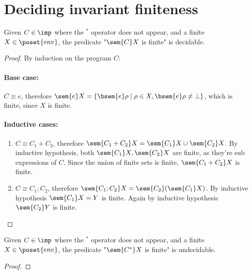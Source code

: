 \section{Deciding invariant finiteness}

\begin{lemma}\label{le:finiteness}
  Given \(C\in\imp\) where the \(^*\) operator does not appear, and a
  finite \(X \in \poset{env}\), the predicate "\(\sem{C}X\) is finite"
  is decidable.
\end{lemma}

\begin{proof}
  By induction on the program \(C\):
  \paragraph*{Base case:\\}
  \(C \equiv e\), therefore \(\sem{e}X = \{\bsem{e}\rho \mid \rho \in
  X , \bsem{e}\rho \neq \bot\}\), which is finite, since \(X\) is
  finite.
  
  \paragraph*{Inductive cases:\\}
  \begin{enumerate}
  \item \(C\equiv C_1 + C_2\), therefore \(\sem{C_1 + C_2} X =
    \sem{C_1}X \cup \sem{C_2}X\). By inductive hypothesis, both
    \(\sem{C_1}X, \sem{C_2}X\) are finite, as they're sub expressions
    of \(C\). Since the union of finite sets is finite, \(\sem{C_1 +
      C_2}X\) is finite.
  \item \(C\equiv C_1; C_2\), therefore \(\sem{C_1;C_2}X =
    \sem{C_2}(\sem{C_1}X)\). By inductive hypothesis \(\sem{C_1}X =
    Y\) is finite. Again by inductive hypothesis \(\sem{C_2}Y\) is
    finite.
  \end{enumerate}
\end{proof}

\begin{lemma}\label{le:infiniteness}
  Given \(C\in\imp\) where the \(^*\) operator does not appear, and a
  finite \(X \in \poset{env}\), the predicate "\(\sem{C^*}X\) is
  finite" is undecidable.
\end{lemma}

\begin{proof}
\end{proof}
